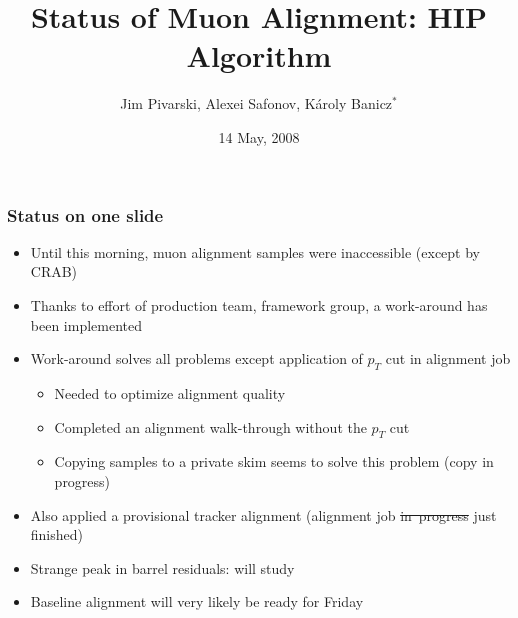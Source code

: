\documentclass[compress]{beamer}
\title{Status of Muon Alignment: HIP Algorithm}
\author{Jim Pivarski, Alexei Safonov, K\'aroly Banicz$^*$}
\institute{Texas A\&M University, $^*$FermiLab}
\date{14 May, 2008}
\begin{document}
\frame{\titlepage}


\begin{frame}
\frametitle{Status on one slide}
\begin{itemize}\setlength{\itemsep}{0.25 cm}
\item Until this morning, muon alignment samples were inaccessible (except by CRAB)
\item Thanks to effort of production team, framework group, a work-around has been implemented
\item Work-around solves all problems except application of $p_T$ cut in alignment job
\begin{itemize}\setlength{\itemsep}{0.1 cm}
\item Needed to optimize alignment quality
\item Completed an alignment walk-through without the $p_T$ cut
\item Copying samples to a private skim seems to solve this problem (copy in progress)
\end{itemize}
\item Also applied a provisional tracker alignment (alignment job \sout{in~progress} just finished)
\item Strange peak in barrel residuals: will study
\item Baseline alignment will very likely be ready for Friday
\end{itemize}
\end{frame}
\end{document}
